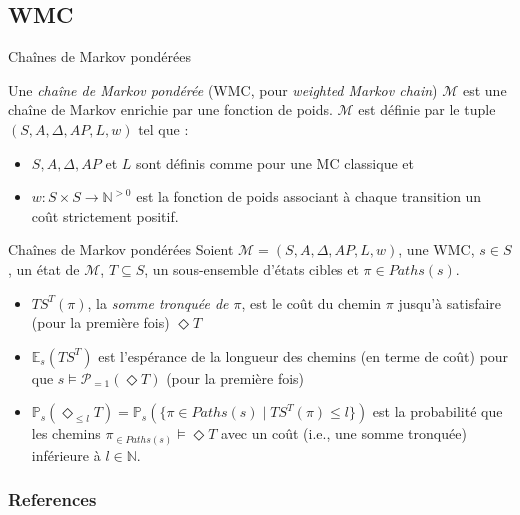 \documentclass[compress]{beamer}
\begin{document}
\subsection{WMC}
\begin{frame}{Chaînes de Markov pondérées}
  \begin{definition}
    Une \textit{chaîne de Markov pondérée} (WMC, pour \textit{weighted Markov chain}) $\mathcal{M}$ est une chaîne de Markov enrichie par une fonction de poids. $\mathcal{M}$ est définie par le tuple $(S, A, \Delta, AP, L, w)$
    tel que :
    \begin{itemize}
      \item $S, A, \Delta, AP$ et $L$ sont définis comme pour une MC classique et
      \item $w : S \times S \rightarrow \mathbb{N}^{>0}$ est la fonction
        de poids associant à chaque transition un coût strictement positif.
    \end{itemize}
  \end{definition}
\end{frame}
\begin{frame}{Chaînes de Markov pondérées}
    Soient $\mathcal{M} = (S, A, \Delta, AP, L, w)$, une WMC, $s \in S$, un état
    de $\mathcal{M}$, $T \subseteq S$, un sous-ensemble d'états cibles et $\pi \in Paths(s)$.
  \begin{itemize}
  \item $TS^T(\pi)$, la \textit{\color{fibeamer@orange}somme tronquée de $\pi$}, est le coût du chemin $\pi$ jusqu'à satisfaire {\color{fibeamer@orange}(pour la première fois)} $\Diamond T$
  \item $\mathbb{E}_s(TS^T)$ est l'espérance de la longueur des chemins (en terme de coût) pour que $s \models \mathcal{P}_{=1}(\Diamond T)$ (pour la première fois)
  \item $\mathbb{P}_s(\Diamond_{\leq l}T) = \mathbb{P}_s(\{ \pi \in Paths(s) \; | \; TS^T(\pi) \leq l \})$ est la probabilité que les chemins $\pi_{\in Paths(s)} \models \Diamond T$ avec un coût (i.e., une somme tronquée) inférieure à $l \in \mathbb{N}$.
  \end{itemize}
\end{frame}

\begin{frame}[allowframebreaks]
        \frametitle{References}
      \printbibliography
\end{frame}
\end{document}
